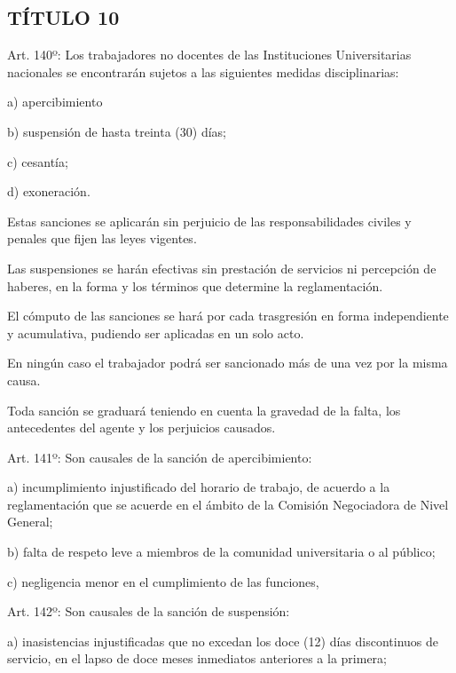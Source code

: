 \documentclass[]{article}
\begin{document}
\subsection{TÍTULO 10}\label{tuxedtulo-10}


Art. 140º: Los trabajadores no docentes de las Instituciones
Universitarias nacionales se encontrarán sujetos a las siguientes
medidas disciplinarias:

a) apercibimiento

b) suspensión de hasta treinta (30) días;

c) cesantía;

d) exoneración.

Estas sanciones se aplicarán sin perjuicio de las responsabilidades
civiles y penales que fijen las leyes vigentes.

Las suspensiones se harán efectivas sin prestación de servicios ni
percepción de haberes, en la forma y los términos que determine la
reglamentación.

El cómputo de las sanciones se hará por cada trasgresión en forma
independiente y acumulativa, pudiendo ser aplicadas en un solo acto.

En ningún caso el trabajador podrá ser sancionado más de una vez por la
misma causa.

Toda sanción se graduará teniendo en cuenta la gravedad de la falta, los
antecedentes del agente y los perjuicios causados.

Art. 141º: Son causales de la sanción de apercibimiento:

a) incumplimiento injustificado del horario de trabajo, de acuerdo a la
reglamentación que se acuerde en el ámbito de la Comisión Negociadora de
Nivel General;

b) falta de respeto leve a miembros de la comunidad universitaria o al
público;

c) negligencia menor en el cumplimiento de las funciones,

Art. 142º: Son causales de la sanción de suspensión:

a) inasistencias injustificadas que no excedan los doce (12) días
discontinuos de servicio, en el lapso de doce meses inmediatos
anteriores a la primera;
\end{document}
